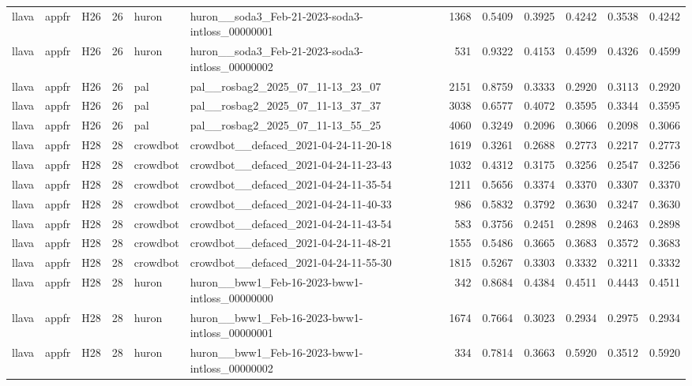 \begin{table}[tbp]
\begin{tabular}{lllrllrrrrrr}
llava & appfr & H26 & 26 & huron & huron\_\_soda3\_Feb-21-2023-soda3-intloss\_00000001 & 1368 & 0.5409 & 0.3925 & 0.4242 & 0.3538 & 0.4242 \\
llava & appfr & H26 & 26 & huron & huron\_\_soda3\_Feb-21-2023-soda3-intloss\_00000002 & 531 & 0.9322 & 0.4153 & 0.4599 & 0.4326 & 0.4599 \\
llava & appfr & H26 & 26 & pal & pal\_\_rosbag2\_2025\_07\_11-13\_23\_07 & 2151 & 0.8759 & 0.3333 & 0.2920 & 0.3113 & 0.2920 \\
llava & appfr & H26 & 26 & pal & pal\_\_rosbag2\_2025\_07\_11-13\_37\_37 & 3038 & 0.6577 & 0.4072 & 0.3595 & 0.3344 & 0.3595 \\
llava & appfr & H26 & 26 & pal & pal\_\_rosbag2\_2025\_07\_11-13\_55\_25 & 4060 & 0.3249 & 0.2096 & 0.3066 & 0.2098 & 0.3066 \\
llava & appfr & H28 & 28 & crowdbot & crowdbot\_\_defaced\_2021-04-24-11-20-18 & 1619 & 0.3261 & 0.2688 & 0.2773 & 0.2217 & 0.2773 \\
llava & appfr & H28 & 28 & crowdbot & crowdbot\_\_defaced\_2021-04-24-11-23-43 & 1032 & 0.4312 & 0.3175 & 0.3256 & 0.2547 & 0.3256 \\
llava & appfr & H28 & 28 & crowdbot & crowdbot\_\_defaced\_2021-04-24-11-35-54 & 1211 & 0.5656 & 0.3374 & 0.3370 & 0.3307 & 0.3370 \\
llava & appfr & H28 & 28 & crowdbot & crowdbot\_\_defaced\_2021-04-24-11-40-33 & 986 & 0.5832 & 0.3792 & 0.3630 & 0.3247 & 0.3630 \\
llava & appfr & H28 & 28 & crowdbot & crowdbot\_\_defaced\_2021-04-24-11-43-54 & 583 & 0.3756 & 0.2451 & 0.2898 & 0.2463 & 0.2898 \\
llava & appfr & H28 & 28 & crowdbot & crowdbot\_\_defaced\_2021-04-24-11-48-21 & 1555 & 0.5486 & 0.3665 & 0.3683 & 0.3572 & 0.3683 \\
llava & appfr & H28 & 28 & crowdbot & crowdbot\_\_defaced\_2021-04-24-11-55-30 & 1815 & 0.5267 & 0.3303 & 0.3332 & 0.3211 & 0.3332 \\
llava & appfr & H28 & 28 & huron & huron\_\_bww1\_Feb-16-2023-bww1-intloss\_00000000 & 342 & 0.8684 & 0.4384 & 0.4511 & 0.4443 & 0.4511 \\
llava & appfr & H28 & 28 & huron & huron\_\_bww1\_Feb-16-2023-bww1-intloss\_00000001 & 1674 & 0.7664 & 0.3023 & 0.2934 & 0.2975 & 0.2934 \\
llava & appfr & H28 & 28 & huron & huron\_\_bww1\_Feb-16-2023-bww1-intloss\_00000002 & 334 & 0.7814 & 0.3663 & 0.5920 & 0.3512 & 0.5920 \\

\end{tabular}
\end{table}
